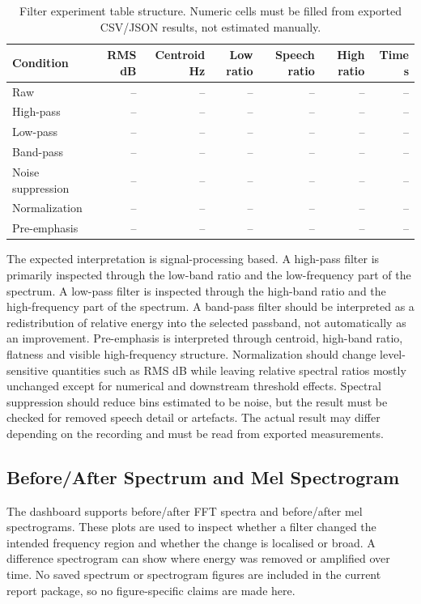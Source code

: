 ﻿\documentclass[11pt,a4paper]{article}
\begin{document}
\begin{table}[h]
\centering
\caption{Filter experiment table structure. Numeric cells must be filled from exported CSV/JSON results, not estimated manually.}
\label{tab:filter-template}
\begin{tabular}{lrrrrrr}
\toprule
Condition & RMS dB & Centroid Hz & Low ratio & Speech ratio & High ratio & Time s \\
\midrule
Raw & -- & -- & -- & -- & -- & -- \\
High-pass & -- & -- & -- & -- & -- & -- \\
Low-pass & -- & -- & -- & -- & -- & -- \\
Band-pass & -- & -- & -- & -- & -- & -- \\
Noise suppression & -- & -- & -- & -- & -- & -- \\
Normalization & -- & -- & -- & -- & -- & -- \\
Pre-emphasis & -- & -- & -- & -- & -- & -- \\
\bottomrule
\end{tabular}
\end{table}

The expected interpretation is signal-processing based. A high-pass filter is primarily inspected through the low-band ratio and the low-frequency part of the spectrum. A low-pass filter is inspected through the high-band ratio and the high-frequency part of the spectrum. A band-pass filter should be interpreted as a redistribution of relative energy into the selected passband, not automatically as an improvement. Pre-emphasis is interpreted through centroid, high-band ratio, flatness and visible high-frequency structure. Normalization should change level-sensitive quantities such as RMS dB while leaving relative spectral ratios mostly unchanged except for numerical and downstream threshold effects. Spectral suppression should reduce bins estimated to be noise, but the result must be checked for removed speech detail or artefacts. The actual result may differ depending on the recording and must be read from exported measurements.

\subsection{Before/After Spectrum and Mel Spectrogram}
The dashboard supports before/after FFT spectra and before/after mel spectrograms. These plots are used to inspect whether a filter changed the intended frequency region and whether the change is localised or broad. A difference spectrogram can show where energy was removed or amplified over time. No saved spectrum or spectrogram figures are included in the current report package, so no figure-specific claims are made here.
\end{document}

